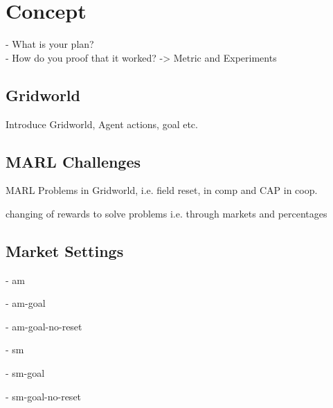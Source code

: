 %
%
\chapter{Concept}\label{sec:Concept}
- What is your plan? \\
- How do you proof that it worked? -> Metric and Experiments


\section{Gridworld}
Introduce Gridworld, Agent actions, goal etc.

\section{MARL Challenges}
MARL Problems in Gridworld, i.e. field reset, in comp and CAP in coop.

changing of rewards to solve problems i.e. through markets and percentages

\section{Market Settings}
- am

- am-goal

- am-goal-no-reset

- sm

- sm-goal

- sm-goal-no-reset